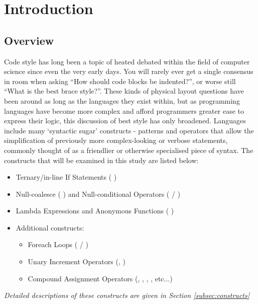 \documentclass{article}
\begin{document}
\newpage
\section{Introduction}
    \subsection{Overview}
    \label{sec:overview}
        Code style has long been a topic of heated debated within the field of computer science since even the very early days. You will rarely ever get a single consensus in room when asking ``How should code blocks be indented?'', or worse still ``What is the best brace style?''. These kinds of physical layout questions have been around as long as the languages they exist within, but as programming languages have become more complex and afford programmers greater ease to express their logic, this discussion of best style has only broadened. Languages include many `syntactic sugar' constructs - patterns and operators that allow the simplification of previously more complex-looking or verbose statements, commonly thought of as a friendlier or otherwise specialised piece of syntax. The constructs that will be examined in this study are listed below:

        \begin{itemize}
            \item Ternary/in-line If Statements (  )
            \item Null-coalesce (  ) and Null-conditional Operators (  / )
            \item Lambda Expressions and Anonymous Functions (  )
            \item Additional constructs:
            \begin{itemize}
                \item Foreach Loops (  / )
                \item Unary Increment Operators (, )
                \item Compound Assignment Operators (,  , , , etc...)
            \end{itemize}
        \end{itemize}
        
        \emph{Detailed descriptions of these constructs are given in Section \ref{subsec:constructs}}\\
\end{document}

